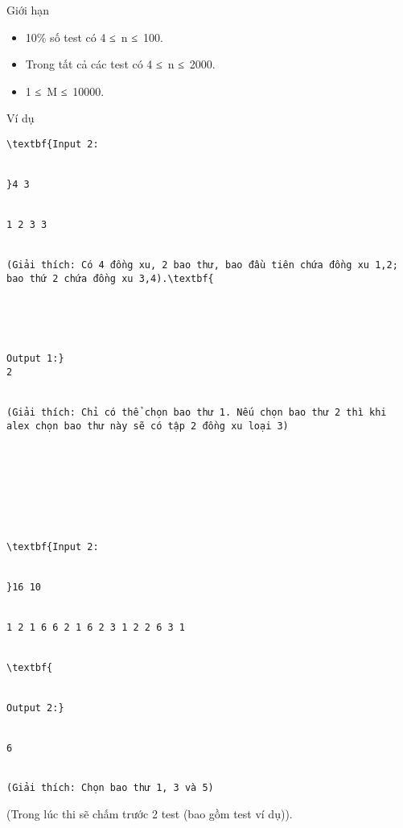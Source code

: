 Giới hạn
\begin{itemize}
	\item     10\% số test có 4 ≤ n ≤ 100.   
	\item     Trong tất cả các test có 4 ≤ n ≤ 2000.   
	\item     1 ≤ M ≤ 10000.   
\end{itemize}
\begin{itemize}
\end{itemize}
Ví dụ
\begin{verbatim}
\textbf{Input 2:


}4 3


1 2 3 3


(Giải thích: Có 4 đồng xu, 2 bao thư, bao đầu tiên chứa đồng xu 1,2; bao thứ 2 chứa đồng xu 3,4).\textbf{





Output 1:}
2


(Giải thích: Chỉ có thể chọn bao thư 1. Nếu chọn bao thư 2 thì khi alex chọn bao thư này sẽ có tập 2 đồng xu loại 3)








\textbf{Input 2:


}16 10


1 2 1 6 6 2 1 6 2 3 1 2 2 6 3 1


\textbf{


Output 2:}


6


(Giải thích: Chọn bao thư 1, 3 và 5)\end{verbatim}

(Trong lúc thi sẽ chấm trước 2 test (bao gồm test ví dụ)).
